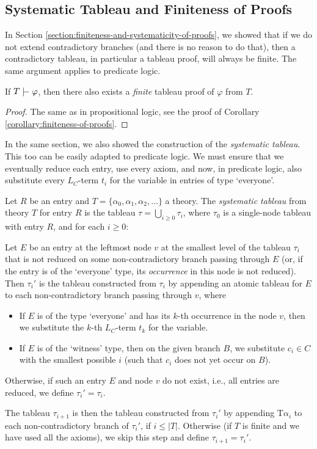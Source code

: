 \subsection{Systematic Tableau and Finiteness of Proofs}

In Section \ref{section:finiteness-and-systematicity-of-proofs}, we showed that if we do not extend contradictory branches (and there is no reason to do that), then a contradictory tableau, in particular a tableau proof, will always be finite. The same argument applies to predicate logic.

\begin{corollary}\label{corollary:finiteness-of-proofs-predicate}
    If $T\proves\varphi$, then there also exists a \emph{finite} tableau proof of $\varphi$ from $T$.
\end{corollary}
\begin{proof}
The same as in propositional logic, see the proof of Corollary \ref{corollary:finiteness-of-proofs}.
\end{proof}

In the same section, we also showed the construction of the \emph{systematic tableau}. This too can be easily adapted to predicate logic. We must ensure that we eventually reduce each entry, use every axiom, and now, in predicate logic, also substitute every $L_C$-term $t_i$ for the variable in entries of type `everyone'.

\begin{definition}
Let $R$ be an entry and $T=\{\alpha_0,\alpha_1,\alpha_2,\dots\}$ a theory. The \emph{systematic tableau} from theory $T$ for entry $R$ is the tableau $\tau=\bigcup_{i\geq 0}\tau_i$, where $\tau_0$ is a single-node tableau with entry $R$, and for each $i\geq 0$:

Let $E$ be an entry at the leftmost node $v$ at the smallest level of the tableau $\tau_i$ that is not reduced on some non-contradictory branch passing through $E$ (or, if the entry is of the `everyone' type, its \emph{occurrence} in this node is not reduced). Then $\tau_i'$ is the tableau constructed from $\tau_i$ by appending an atomic tableau for $E$ to each non-contradictory branch passing through $v$, where
\begin{itemize}
    \item If $E$ is of the type `everyone' and has its $k$-th occurrence in the node $v$, then we substitute the $k$-th $L_C$-term $t_k$ for the variable.
    \item If $E$ is of the `witness' type, then on the given branch $B$, we substitute $c_i\in C$ with the smallest possible $i$ (such that $c_i$ does not yet occur on $B$).
\end{itemize}
Otherwise, if such an entry $E$ and node $v$ do not exist, i.e., all entries are reduced, we define $\tau_i'=\tau_i$.

The tableau $\tau_{i+1}$ is then the tableau constructed from $\tau_i'$ by appending $\mathrm{T}\alpha_i$ to each non-contradictory branch of $\tau_i'$, if $i\leq |T|$. Otherwise (if $T$ is finite and we have used all the axioms), we skip this step and define $\tau_{i+1}=\tau_i'$. 
\end{definition}

